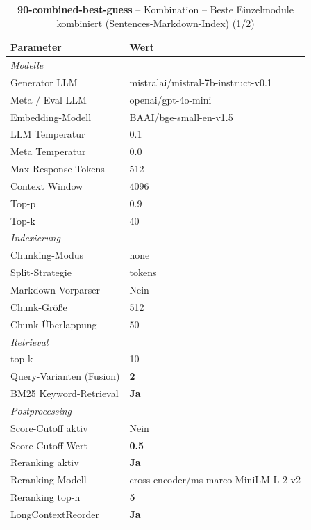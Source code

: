 \begin{table}[H]
\centering
\small
\setlength{\tabcolsep}{4pt}
\begin{tabular}{lp{8cm}}
\toprule
\textbf{Parameter} & \textbf{Wert} \\
\midrule
\multicolumn{2}{l}{\textit{Modelle}} \\
\midrule
\quad Generator LLM & mistralai/mistral-7b-instruct-v0.1 \\
\quad Meta / Eval LLM & openai/gpt-4o-mini \\
\quad Embedding-Modell & BAAI/bge-small-en-v1.5 \\
\quad LLM Temperatur & 0.1 \\
\quad Meta Temperatur & 0.0 \\
\quad Max Response Tokens & 512 \\
\quad Context Window & 4096 \\
\quad Top-p & 0.9 \\
\quad Top-k & 40 \\
\midrule
\multicolumn{2}{l}{\textit{Indexierung}} \\
\midrule
\quad Chunking-Modus & none \\
\quad Split-Strategie & tokens \\
\quad Markdown-Vorparser & Nein \\
\quad Chunk-Größe & 512 \\
\quad Chunk-Überlappung & 50 \\
\midrule
\multicolumn{2}{l}{\textit{Retrieval}} \\
\midrule
\quad top-k & 10 \\
\quad Query-Varianten (Fusion) & \textbf{2} \\
\quad BM25 Keyword-Retrieval & \textbf{Ja} \\
\midrule
\multicolumn{2}{l}{\textit{Postprocessing}} \\
\midrule
\quad Score-Cutoff aktiv & Nein \\
\quad Score-Cutoff Wert & \textbf{0.5} \\
\quad Reranking aktiv & \textbf{Ja} \\
\quad Reranking-Modell & cross-encoder/ms-marco-MiniLM-L-2-v2 \\
\quad Reranking top-n & \textbf{5} \\
\quad LongContextReorder & \textbf{Ja} \\
\bottomrule
\end{tabular}
\caption{\textbf{90-combined-best-guess} -- Kombination -- Beste Einzelmodule kombiniert (Sentences-Markdown-Index) (1/2)}
\label{tab:config_90_combined_best_guess_a}
\end{table}

